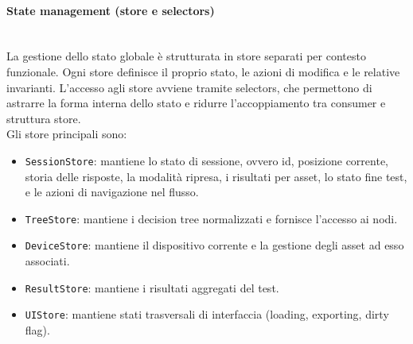 \documentclass[a4paper,12pt]{article}
\begin{document}
            \paragraph{State management (store e selectors)}\mbox{}\\
                La gestione dello stato globale è strutturata in store separati per contesto funzionale. Ogni store definisce il proprio stato, le azioni di modifica e le relative invarianti. L'accesso agli store avviene tramite selectors, che permettono di astrarre la forma interna dello stato e ridurre l'accoppiamento tra consumer e struttura store. \\
                Gli store principali sono:
                \begin{itemize}
                    \item \texttt{SessionStore}: mantiene lo stato di sessione, ovvero id, posizione corrente, storia delle risposte, la modalità ripresa, i risultati per asset, lo stato fine test, e le azioni di navigazione nel flusso.
                    \item \texttt{TreeStore}: mantiene i decision tree normalizzati e fornisce l'accesso ai nodi.
                    \item \texttt{DeviceStore}: mantiene il dispositivo corrente e la gestione degli asset ad esso associati.
                    \item \texttt{ResultStore}: mantiene i risultati aggregati del test.
                    \item \texttt{UIStore}: mantiene stati trasversali di interfaccia (loading, exporting, dirty flag).
                \end{itemize}
        
\end{document}
